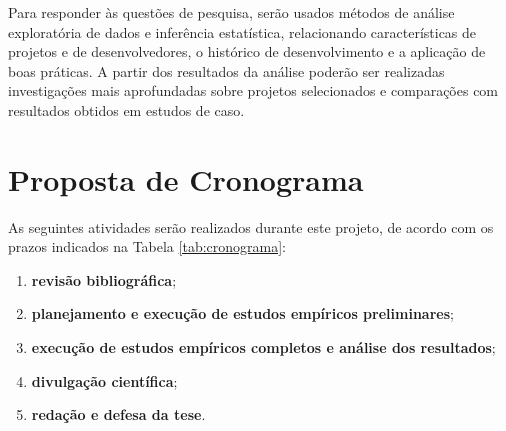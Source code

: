 \documentclass{article}
\begin{document}
Para responder às questões de pesquisa, serão usados métodos de análise
exploratória de dados e inferência estatística, relacionando características de
projetos e de desenvolvedores, o histórico de desenvolvimento e a aplicação de
boas práticas. A partir dos resultados da análise poderão ser realizadas
investigações mais aprofundadas sobre projetos selecionados e comparações com
resultados obtidos em estudos de caso.


\section{Proposta de Cronograma}
\newcommand{\newrow}{\\\hline}
\newcommand{\x}{$\bullet$}

As seguintes atividades serão realizados durante este projeto, de acordo com os
prazos indicados na Tabela \ref{tab:cronograma}:

\begin{enumerate}
  \item \label{prevista:estudos}
    \textbf{revisão bibliográfica};
  \item \label{prevista:preliminares}
    \textbf{planejamento e execução de estudos empíricos preliminares};
  \item \label{prevista:experimentos}
    \textbf{execução de estudos empíricos completos e análise dos resultados};
  \item \label{prevista:artigos}
    \textbf{divulgação científica};
  \item \label{prevista:redacao}
    \textbf{redação e defesa da tese}.
\end{enumerate}
\end{document}
